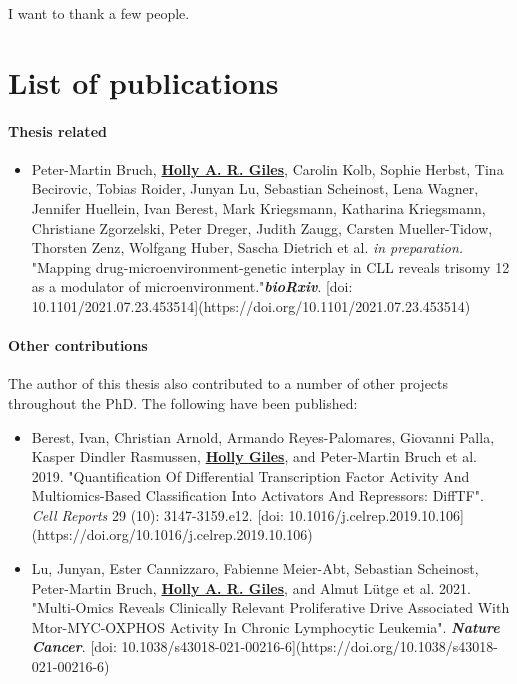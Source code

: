 \documentclass[11pt, a4paper, twosided]{book}
\begin{document}
I want to thank a few people.
\newpage\null\newpage


    \hypertarget{list-of-publications}{%
    \chapter*{List of publications}\label{list-of-publications}}

    \hypertarget{thesis-related}{%
    \subsubsection*{Thesis related}\label{thesis-related}}
    \begin{itemize}
        \item  Peter-Martin Bruch\ast,  \textbf{\underline{Holly A. R. Giles}}\ast, Carolin Kolb, Sophie Herbst, Tina Becirovic, Tobias Roider, Junyan Lu, Sebastian Scheinost, Lena Wagner, Jennifer Huellein, Ivan Berest, Mark Kriegsmann, Katharina Kriegsmann, Christiane Zgorzelski, Peter Dreger, Judith Zaugg, Carsten Mueller-Tidow, Thorsten Zenz, Wolfgang Huber, Sascha Dietrich et al. \textit{in preparation.}  "Mapping drug-microenvironment-genetic interplay in CLL reveals trisomy 12 as a modulator of microenvironment."\textbf{\textit{bioRxiv}}. [doi: 10.1101/2021.07.23.453514](https://doi.org/10.1101/2021.07.23.453514)
    \end{itemize}
    \hypertarget{other-contributions}{%
    \subsubsection*{Other contributions}\label{other-contributions}}

    The author of this thesis also contributed to a number of other projects throughout the PhD. The following have been published:
    \begin{itemize}
        \item Berest, Ivan\ast, Christian Arnold\ast, Armando Reyes-Palomares, Giovanni Palla, Kasper Dindler Rasmussen, \textbf{\underline{Holly Giles}}, and Peter-Martin Bruch et al. 2019. "Quantification Of Differential Transcription Factor Activity And Multiomics-Based Classification Into Activators And Repressors: DiffTF". \textit{Cell Reports} 29 (10): 3147-3159.e12. [doi: 10.1016/j.celrep.2019.10.106](https://doi.org/10.1016/j.celrep.2019.10.106)
        
      \item Lu, Junyan\ast, Ester Cannizzaro\ast, Fabienne Meier-Abt, Sebastian Scheinost, Peter-Martin Bruch, \textbf{\underline{Holly A. R. Giles}}, and Almut Lütge et al. 2021. "Multi-Omics Reveals Clinically Relevant Proliferative Drive Associated With Mtor-MYC-OXPHOS Activity In Chronic Lymphocytic Leukemia". \textbf{\textit{Nature Cancer}}. [doi: 10.1038/s43018-021-00216-6](https://doi.org/10.1038/s43018-021-00216-6)
    \end{itemize}
\newpage\null\newpage
\end{document}
